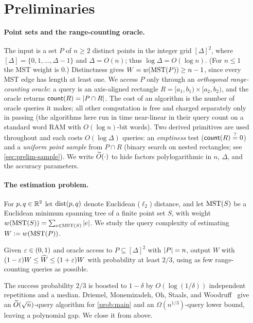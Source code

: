 \section{Preliminaries}\label{sec:prelim}

\paragraph{Point sets and the range-counting oracle.}
The input is a set $P$ of $n\ge 2$ distinct points in the integer grid $[\Delta]^2$, where
$[\Delta]=\{0,1,\dots,\Delta-1\}$ and $\Delta=O(n)$; thus $\log\Delta=O(\log n)$. (For $n\le 1$ the MST
weight is $0$.) Distinctness gives $W=w(\mathrm{MST}(P))\ge n-1$, since every MST edge has length at least one. We access $P$ only
through an \emph{orthogonal range-counting oracle}: a query is an axis-aligned rectangle
$R=[a_1,b_1)\times[a_2,b_2)$, and the oracle returns $\mathsf{count}(R)=\left|P\cap R\right|$. The cost of an algorithm
is the number of oracle queries it makes; all other computation is free and charged separately only in
passing (the algorithms here run in time near-linear in their query count on a standard word RAM with
$O(\log n)$-bit words). Two derived primitives are used throughout and each costs $O(\log\Delta)$
queries: an \emph{emptiness} test ($\mathsf{count}(R)\overset{?}{=}0$) and a \emph{uniform point sample} from
$P\cap R$ (binary search on nested rectangles; see \cref{sec:prelim-sample}). We write $\widetilde{O}(\cdot)$ to
hide factors polylogarithmic in $n$, $\Delta$, and the accuracy parameters.

\paragraph{The estimation problem.}
For $p,q\in\mathbb{R}^2$ let $\operatorname{dist}(p,q)$ denote Euclidean ($\ell_2$) distance, and let $\mathrm{MST}(S)$ be a Euclidean
minimum spanning tree of a finite point set $S$, with weight $w(\mathrm{MST}(S))=\sum_{e\in\mathrm{MST}(S)}\left|e\right|$.
We study the query complexity of estimating $W\vcentcolon=w(\mathrm{MST}(P))$.

\begin{problem}\label{prob:main}
Given $\varepsilon\in(0,1)$ and oracle access to $P\subseteq[\Delta]^2$ with $\left|P\right|=n$, output $\widehat W$
with $(1-\varepsilon)W\le\widehat W\le(1+\varepsilon)W$ with probability at least $2/3$, using as few range-counting
queries as possible.
\end{problem}

The success probability $2/3$ is boosted to $1-\delta$ by $O(\log(1/\delta))$ independent repetitions and
a median. Driemel, Monemizadeh, Oh, Staals, and Woodruff~\cite{DMOSW25} give an $\widetilde{O}(\sqrt n)$-query
algorithm for \cref{prob:main} and an $\Omega(n^{1/3})$-query lower bound, leaving a polynomial gap. We
close it from above.

